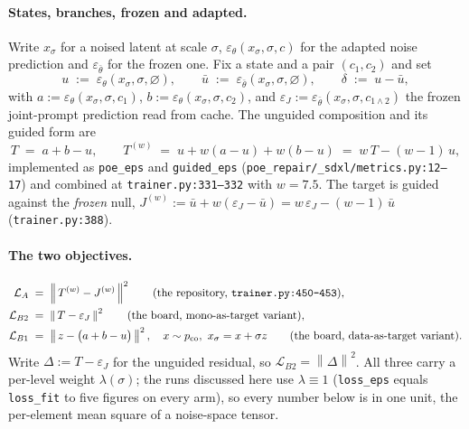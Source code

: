 \documentclass[11pt]{article}
\newcommand{\eps}{\varepsilon}
\newcommand{\epsth}{\eps_\theta}
\newcommand{\epsfr}{\eps_{\bar\theta}}
\newcommand{\xs}{x_\sigma}
\newcommand{\norm}[1]{\left\lVert #1 \right\rVert}
\newcommand{\cnull}{\varnothing}
\theoremstyle{plain}
\theoremstyle{remark}
\begin{document}
\paragraph{States, branches, frozen and adapted.}
Write $\xs$ for a noised latent at scale $\sigma$, $\epsth(\xs,\sigma,c)$ for the adapted
noise prediction and $\epsfr$ for the frozen one. Fix a state and a pair $(c_1,c_2)$ and set
\begin{equation}
  u \;:=\; \epsth(\xs,\sigma,\cnull), \qquad
  \bar u \;:=\; \epsfr(\xs,\sigma,\cnull), \qquad
  \delta \;:=\; u - \bar u ,
  \label{eq:coords}
\end{equation}
with $a := \epsth(\xs,\sigma,c_1)$, $b := \epsth(\xs,\sigma,c_2)$, and $\eps_J :=
\epsfr(\xs,\sigma,c_{1\wedge 2})$ the frozen joint-prompt prediction read from cache. The
unguided composition and its guided form are
\begin{equation}
  T \;=\; a + b - u , \qquad
  T^{(w)} \;=\; u + w(a-u) + w(b-u) \;=\; w\,T - (w-1)\,u ,
  \label{eq:compose}
\end{equation}
implemented as \texttt{poe\_eps} and \texttt{guided\_eps}
(\texttt{poe\_repair/\_sdxl/metrics.py:12--17}) and combined at
\texttt{trainer.py:331--332} with $w = 7.5$. The target is guided against the \emph{frozen}
null, $J^{(w)} := \bar u + w(\eps_J - \bar u) = w\,\eps_J - (w-1)\,\bar u$
(\texttt{trainer.py:388}).

\paragraph{The two objectives.}
\begin{align}
  \mathcal{L}_A &\;=\; \norm{\,T^{(w)} - J^{(w)}\,}^2
  \qquad\text{(the repository, \texttt{trainer.py:450--453})},
  \label{eq:LA}\\
  \mathcal{L}_{B2} &\;=\; \norm{\,T - \eps_J\,}^2
  \qquad\text{(the board, mono-as-target variant)},
  \label{eq:LB2}\\
  \mathcal{L}_{B1} &\;=\; \norm{\,z - \big(a + b - u\big)\,}^2,
  \quad x \sim p_{\mathrm{co}},\ \xs = x + \sigma z
  \qquad\text{(the board, data-as-target variant)}.
  \label{eq:LB1}
\end{align}
Write $\Delta := T - \eps_J$ for the unguided residual, so $\mathcal{L}_{B2} = \norm{\Delta}^2$.
All three carry a per-level weight $\lambda(\sigma)$; the runs discussed here use
$\lambda \equiv 1$ (\texttt{loss\_eps} equals \texttt{loss\_fit} to five figures on every arm),
so every number below is in one unit, the per-element mean square of a noise-space tensor.
\end{document}
